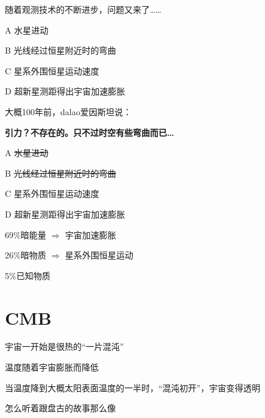 \documentclass[CJK]{beamer}
\begin{document}
\begin{frame}
  \bch
  随着观测技术的不断进步，问题又来了……
  \ech
\end{frame}


\begin{frame}
  \bch
  \emini
  \bitem
\item[A]{水星进动}
\item[B]{光线经过恒星附近时的弯曲}
\item[C]{星系外围恒星运动速度}
\item[D]{超新星测距得出宇宙加速膨胀}
  \eitem
  \emini
  \ech
\end{frame}

\begin{frame}
  \bch

  
  \emini
  大概100年前，dalao爱因斯坦说：

  \skipline
  
  {\Large \bf 引力？不存在的。只不过时空有些弯曲而已…}

  \skiplines
  
  \bitem
\item[A]{\sout{水星进动}}
\item[B]{\sout{光线经过恒星附近时的弯曲}}
\item[C]{星系外围恒星运动速度}
\item[D]{超新星测距得出宇宙加速膨胀}  
  \eitem
  \emini
  \ech
\end{frame}

\begin{frame}
  \bch
  \emini
  \bitem
\item{69\%暗能量 $\Rightarrow$ 宇宙加速膨胀}
\item{26\%暗物质 $\Rightarrow$ 星系外围恒星运动}
\item{5\%已知物质}
  \eitem
  \emini
  \ech
\end{frame}

\section{CMB}

\begin{frame}
  \bch
  \bitem
\item{宇宙一开始是很热的“一片混沌”
}
\item{温度随着宇宙膨胀而降低}
\item{当温度降到大概太阳表面温度的一半时，“混沌初开”，宇宙变得透明}
  \eitem

  \wulian 怎么听着跟盘古的故事那么像
  
  \ech
\end{frame}
\end{document}
